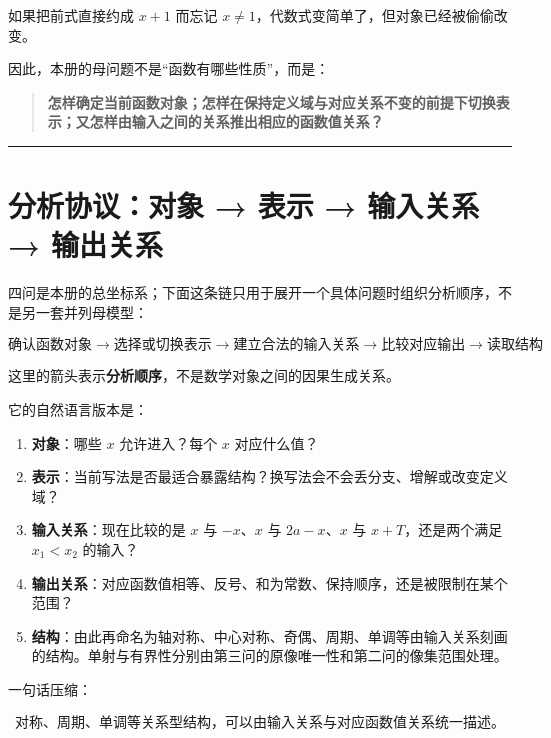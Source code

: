 \documentclass[11pt,a4paper]{ctexart}
\providecommand{\tightlist}{}
\begin{document}
如果把前式直接约成 \(x+1\) 而忘记
\(x\ne1\)，代数式变简单了，但对象已经被偷偷改变。

因此，本册的母问题不是``函数有哪些性质''，而是：

\begin{quote}
\textbf{怎样确定当前函数对象；怎样在保持定义域与对应关系不变的前提下切换表示；又怎样由输入之间的关系推出相应的函数值关系？}
\end{quote}

\begin{center}\rule{0.5\linewidth}{0.5pt}\end{center}

\section{分析协议：对象 → 表示 → 输入关系 → 输出关系}\label{ux6bcdux6a21ux578bux5bf9ux8c61-ux8868ux793a-ux8f93ux5165ux5173ux7cfb-ux8f93ux51faux5173ux7cfb}

四问是本册的总坐标系；下面这条链只用于展开一个具体问题时组织分析顺序，不是另一套并列母模型：

\[
\boxed{
\text{确认函数对象}
\to
\text{选择或切换表示}
\to
\text{建立合法的输入关系}
\to
\text{比较对应输出}
\to
\text{读取结构}
}
\]

这里的箭头表示\textbf{分析顺序}，不是数学对象之间的因果生成关系。

它的自然语言版本是：

\begin{enumerate}
\def\labelenumi{\arabic{enumi}.}
\tightlist
\item
  \textbf{对象}：哪些 \(x\) 允许进入？每个 \(x\) 对应什么值？
\item
  \textbf{表示}：当前写法是否最适合暴露结构？换写法会不会丢分支、增解或改变定义域？
\item
  \textbf{输入关系}：现在比较的是 \(x\) 与 \(-x\)、\(x\) 与
  \(2a-x\)、\(x\) 与 \(x+T\)，还是两个满足 \(x_1<x_2\) 的输入？
\item
  \textbf{输出关系}：对应函数值相等、反号、和为常数、保持顺序，还是被限制在某个范围？
\item
  \textbf{结构}：由此再命名为轴对称、中心对称、奇偶、周期、单调等由输入关系刻画的结构。单射与有界性分别由第三问的原像唯一性和第二问的像集范围处理。
\end{enumerate}

一句话压缩：

\[
\boxed{
\text{对称、周期、单调等关系型结构，可以由输入关系与对应函数值关系统一描述。}
}
\]
\end{document}
